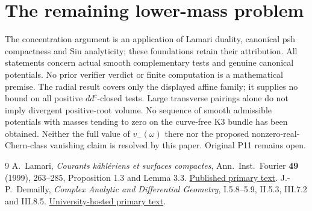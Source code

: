 \documentclass[11pt]{article}
\theoremstyle{remark}\newtheorem{remark}{Remark}
\newcommand{\ddc}{dd^c}
\begin{document}
\section{The remaining lower-mass problem}
The concentration argument is an application of Lamari duality,
canonical psh compactness and Siu analyticity; these foundations retain
their attribution. All statements concern actual smooth complementary
tests and genuine canonical potentials. No prior verifier verdict or
finite computation is a mathematical premise.
The radial result covers only the displayed affine family; it supplies
no bound on all positive $\ddc$-closed tests. Large transverse pairings
alone do not imply divergent positive-root volume. No sequence of smooth
admissible potentials with masses tending to zero on the curve-free
K3 bundle has been obtained. Neither the full value of $v_-(\omega)$
there nor the proposed nonzero-real-Chern-class vanishing claim is
resolved by this paper. Original P11 remains open.

\begin{thebibliography}{9}
 A.~Lamari, \emph{Courants k\"ahl\'eriens et surfaces
compactes}, Ann.~Inst.~Fourier \textbf{49} (1999), 263--285,
Proposition 1.3 and Lemma 3.3.
\href{https://www.numdam.org/article/AIF_1999__49_1_263_0.pdf}{Published primary text}.
 J.-P.~Demailly, \emph{Complex Analytic and Differential
Geometry}, I.5.8--5.9, II.5.3, III.7.2 and III.8.5.
\href{https://www-fourier.univ-grenoble-alpes.fr/~demailly/manuscripts/agbook.pdf}{University-hosted primary text}.
\end{thebibliography}
\end{document}
